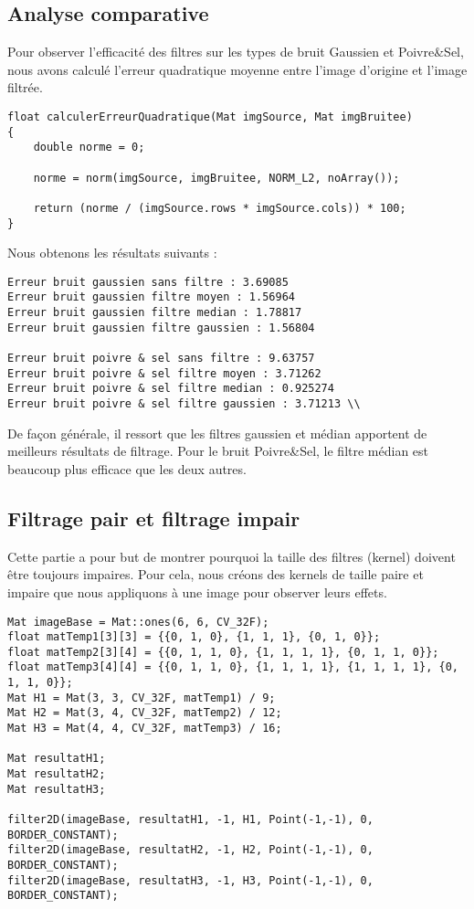 \documentclass{article}
\begin{document}
 \subsection{Analyse comparative}
 Pour observer l'efficacité des filtres sur les types de bruit Gaussien et Poivre\&Sel, nous avons calculé l'erreur quadratique moyenne entre l'image d'origine et l'image filtrée.\\

 \begin{lstlisting}
float calculerErreurQuadratique(Mat imgSource, Mat imgBruitee)
{
    double norme = 0;

    norme = norm(imgSource, imgBruitee, NORM_L2, noArray());

    return (norme / (imgSource.rows * imgSource.cols)) * 100;
}
 \end{lstlisting} 

 Nous obtenons les résultats suivants : 
 
 \begin{lstlisting}
Erreur bruit gaussien sans filtre : 3.69085
Erreur bruit gaussien filtre moyen : 1.56964
Erreur bruit gaussien filtre median : 1.78817
Erreur bruit gaussien filtre gaussien : 1.56804

Erreur bruit poivre & sel sans filtre : 9.63757
Erreur bruit poivre & sel filtre moyen : 3.71262
Erreur bruit poivre & sel filtre median : 0.925274
Erreur bruit poivre & sel filtre gaussien : 3.71213 \\
 \end{lstlisting} 

 De façon générale, il ressort que les filtres gaussien et médian apportent de meilleurs résultats de filtrage. Pour le bruit Poivre\&Sel, le filtre médian est beaucoup plus efficace que les deux autres.
 
 \subsection{Filtrage pair et filtrage impair}
 Cette partie a pour but de montrer pourquoi la taille des filtres (kernel) doivent être toujours impaires. Pour cela, nous créons des kernels de taille paire et impaire que nous appliquons à une image pour observer leurs effets. \\

 \begin{lstlisting}
Mat imageBase = Mat::ones(6, 6, CV_32F);
float matTemp1[3][3] = {{0, 1, 0}, {1, 1, 1}, {0, 1, 0}};
float matTemp2[3][4] = {{0, 1, 1, 0}, {1, 1, 1, 1}, {0, 1, 1, 0}};
float matTemp3[4][4] = {{0, 1, 1, 0}, {1, 1, 1, 1}, {1, 1, 1, 1}, {0, 1, 1, 0}};
Mat H1 = Mat(3, 3, CV_32F, matTemp1) / 9;
Mat H2 = Mat(3, 4, CV_32F, matTemp2) / 12;
Mat H3 = Mat(4, 4, CV_32F, matTemp3) / 16;

Mat resultatH1;
Mat resultatH2;
Mat resultatH3;

filter2D(imageBase, resultatH1, -1, H1, Point(-1,-1), 0, BORDER_CONSTANT);
filter2D(imageBase, resultatH2, -1, H2, Point(-1,-1), 0, BORDER_CONSTANT);
filter2D(imageBase, resultatH3, -1, H3, Point(-1,-1), 0, BORDER_CONSTANT);
 \end{lstlisting} 
\end{document}
